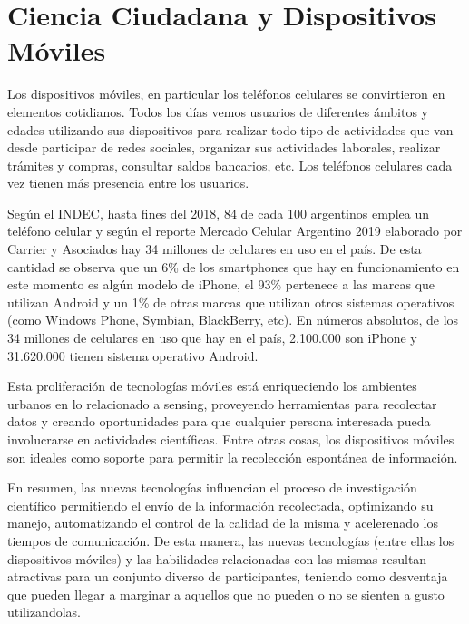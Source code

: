 	
\section{Ciencia Ciudadana y Dispositivos Móviles}

	Los dispositivos móviles, en particular los teléfonos celulares se convirtieron en elementos cotidianos. Todos los días vemos usuarios de diferentes ámbitos y edades utilizando sus dispositivos para realizar todo tipo de actividades que van desde participar de redes sociales, organizar sus actividades laborales, realizar trámites y compras, consultar saldos bancarios, etc. Los teléfonos celulares cada vez tienen más presencia entre los usuarios. 
	
	Según el INDEC, hasta fines del 2018, 84 de cada 100 argentinos emplea un teléfono celular \cite{INDEC} y según el reporte Mercado Celular Argentino 2019 elaborado por Carrier y Asociados hay 34 millones de celulares en uso en el país. De esta cantidad se observa que un 6\% de los smartphones que hay en funcionamiento en este momento es algún modelo de iPhone, el 93\% pertenece a las marcas que utilizan Android y un 1\% de otras marcas que utilizan otros sistemas operativos (como Windows Phone, Symbian, BlackBerry, etc). En números absolutos, de los 34 millones de celulares en uso que hay en el país, 2.100.000 son iPhone y 31.620.000 tienen sistema operativo Android. \cite{carrier}	
		
	Esta proliferación de tecnologías móviles está enriqueciendo los ambientes urbanos en lo relacionado a sensing, proveyendo herramientas para recolectar datos y creando oportunidades para que cualquier persona interesada pueda involucrarse en actividades científicas. Entre otras cosas, los dispositivos móviles son ideales como soporte para permitir la recolección espontánea de información. \cite{kim2013sensr}
	
	En resumen, las nuevas tecnologías influencian el proceso de investigación científico permitiendo el envío de la información recolectada, optimizando su manejo, automatizando el control de la calidad de la misma y acelerenado los tiempos de comunicación. De esta manera, las nuevas tecnologías (entre ellas los dispositivos móviles) y las habilidades relacionadas con las mismas resultan atractivas para un conjunto diverso de participantes, teniendo como desventaja que pueden llegar a marginar a aquellos que no pueden o no se sienten a gusto utilizandolas. \cite{newman2012future}
